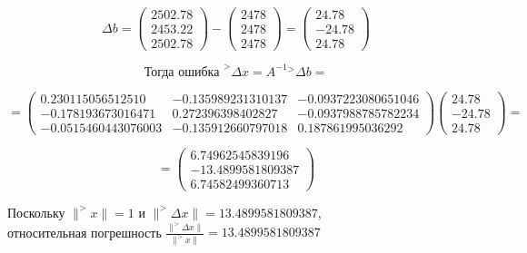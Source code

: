\documentclass[a4paper, 12pt]{extarticle}
\begin{document}
\begin{equation}
    \Delta b =
    \begin{pmatrix}
        2502.78 \\ 
        2453.22 \\ 
        2502.78 
    \end{pmatrix}
    -
    \begin{pmatrix}
        2478 \\ 
        2478 \\ 
        2478 
    \end{pmatrix}
    =
    \begin{pmatrix}
        24.78 \\
        -24.78 \\
        24.78         
    \end{pmatrix}
\end{equation}

\begin{equation*}
    \textrm{Тогда ошибка } ^> \Delta x = A^{-1}{^> \Delta b} =
\end{equation*}

\begin{equation*}
    = 
    \begin{pmatrix}
        0.230115056512510   & -0.135989231310137 & -0.0937223080651046 \\ 
        -0.178193673016471  & 0.272396398402827  & -0.0937988785782234 \\ 
        -0.0515460443076003 & -0.135912660797018 & 0.187861995036292 
    \end{pmatrix}
    \begin{pmatrix}
        24.78 \\
        -24.78 \\
        24.78         
    \end{pmatrix}
    =
\end{equation*}

\begin{equation}
    =
    \begin{pmatrix}
        6.74962545839196 \\
        -13.4899581809387 \\
        6.74582499360713        
    \end{pmatrix}
\end{equation}

\begin{spacing}{1.5}
Поскольку $\lVert ^>x \rVert = 1$ и $\lVert ^> \Delta x \rVert = 13.4899581809387$, \\
относительная погрешность $\frac{\lVert ^> \Delta x \rVert}{\lVert ^>x \rVert} = 13.4899581809387$
\end{spacing}
\end{document}

